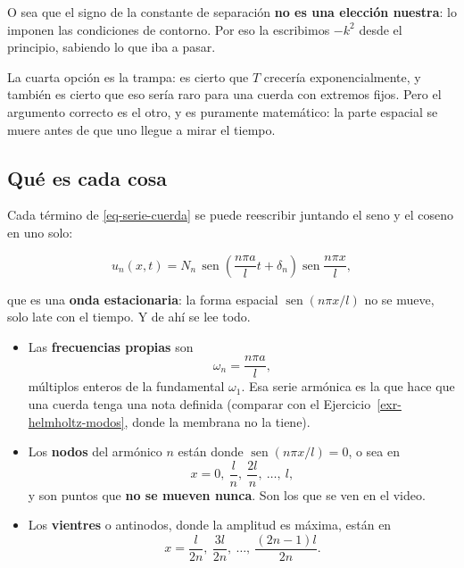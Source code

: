 \documentclass[
  spanish,
  a4paper,
]{scrbook}
\providecommand{\tightlist}{%
  \setlength{\itemsep}{0pt}\setlength{\parskip}{0pt}}
\theoremstyle{definition}
\theoremstyle{plain}
\theoremstyle{definition}
\theoremstyle{plain}
\theoremstyle{definition}
\theoremstyle{remark}
\begin{document}
O sea que el signo de la constante de separación \textbf{no es una
elección nuestra}: lo imponen las condiciones de contorno. Por eso la
escribimos \(-k^2\) desde el principio, sabiendo lo que iba a pasar.

La cuarta opción es la trampa: es cierto que \(T\) crecería
exponencialmente, y también es cierto que eso sería raro para una cuerda
con extremos fijos. Pero el argumento correcto es el otro, y es
puramente matemático: la parte espacial se muere antes de que uno llegue
a mirar el tiempo.

\subsection{Qué es cada cosa}\label{sec-interpretacion}

Cada término de \ref{eq-serie-cuerda} se puede reescribir juntando el
seno y el coseno en uno solo:

\[
u_n(x,t) = N_n\,\operatorname{sen}\!\left(\frac{n\pi a}{l}t + \delta_n\right)
\operatorname{sen}\frac{n\pi x}{l},
\]

que es una \textbf{onda estacionaria}: la forma espacial
\(\operatorname{sen}(n\pi x/l)\) no se mueve, solo late con el tiempo. Y
de ahí se lee todo.

\begin{itemize}
\tightlist
\item
  Las \textbf{frecuencias propias} son \[\omega_n = \frac{n\pi a}{l},\]
  múltiplos enteros de la fundamental \(\omega_1\). Esa serie armónica
  es la que hace que una cuerda tenga una nota definida (comparar con el
  Ejercicio~\ref{exr-helmholtz-modos}, donde la membrana no la tiene).
\item
  Los \textbf{nodos} del armónico \(n\) están donde
  \(\operatorname{sen}(n\pi x/l)=0\), o sea en
  \[x = 0,\ \frac{l}{n},\ \frac{2l}{n},\ \dots,\ l ,\] y son puntos que
  \textbf{no se mueven nunca}. Son los que se ven en el video.
\item
  Los \textbf{vientres} o antinodos, donde la amplitud es máxima, están
  en \[x = \frac{l}{2n},\ \frac{3l}{2n},\ \dots,\ \frac{(2n-1)l}{2n} .\]
\end{itemize}
\end{document}
